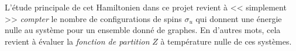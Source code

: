 L'étude principale de cet Hamiltonien dans ce projet revient à << simplement >> \emph{compter} le nombre de configurations de spins $\sigma_u$ qui donnent une énergie nulle au système pour un ensemble donné de graphes.
En d'autres mots, cela revient à évaluer la \emph{fonction de partition} $Z$ à température nulle de ces systèmes.

